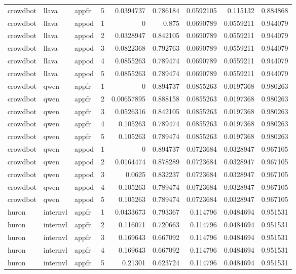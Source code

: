 \begin{longtable}{lllrrrrrr}
crowdbot & llava & appfr & 5 & 0.0394737 & 0.786184 & 0.0592105 & 0.115132 & 0.884868 \\
crowdbot & llava & appod & 1 & 0 & 0.875 & 0.0690789 & 0.0559211 & 0.944079 \\
crowdbot & llava & appod & 2 & 0.0328947 & 0.842105 & 0.0690789 & 0.0559211 & 0.944079 \\
crowdbot & llava & appod & 3 & 0.0822368 & 0.792763 & 0.0690789 & 0.0559211 & 0.944079 \\
crowdbot & llava & appod & 4 & 0.0855263 & 0.789474 & 0.0690789 & 0.0559211 & 0.944079 \\
crowdbot & llava & appod & 5 & 0.0855263 & 0.789474 & 0.0690789 & 0.0559211 & 0.944079 \\
crowdbot & qwen & appfr & 1 & 0 & 0.894737 & 0.0855263 & 0.0197368 & 0.980263 \\
crowdbot & qwen & appfr & 2 & 0.00657895 & 0.888158 & 0.0855263 & 0.0197368 & 0.980263 \\
crowdbot & qwen & appfr & 3 & 0.0526316 & 0.842105 & 0.0855263 & 0.0197368 & 0.980263 \\
crowdbot & qwen & appfr & 4 & 0.105263 & 0.789474 & 0.0855263 & 0.0197368 & 0.980263 \\
crowdbot & qwen & appfr & 5 & 0.105263 & 0.789474 & 0.0855263 & 0.0197368 & 0.980263 \\
crowdbot & qwen & appod & 1 & 0 & 0.894737 & 0.0723684 & 0.0328947 & 0.967105 \\
crowdbot & qwen & appod & 2 & 0.0164474 & 0.878289 & 0.0723684 & 0.0328947 & 0.967105 \\
crowdbot & qwen & appod & 3 & 0.0625 & 0.832237 & 0.0723684 & 0.0328947 & 0.967105 \\
crowdbot & qwen & appod & 4 & 0.105263 & 0.789474 & 0.0723684 & 0.0328947 & 0.967105 \\
crowdbot & qwen & appod & 5 & 0.105263 & 0.789474 & 0.0723684 & 0.0328947 & 0.967105 \\
huron & internvl & appfr & 1 & 0.0433673 & 0.793367 & 0.114796 & 0.0484694 & 0.951531 \\
huron & internvl & appfr & 2 & 0.116071 & 0.720663 & 0.114796 & 0.0484694 & 0.951531 \\
huron & internvl & appfr & 3 & 0.169643 & 0.667092 & 0.114796 & 0.0484694 & 0.951531 \\
huron & internvl & appfr & 4 & 0.169643 & 0.667092 & 0.114796 & 0.0484694 & 0.951531 \\
huron & internvl & appfr & 5 & 0.21301 & 0.623724 & 0.114796 & 0.0484694 & 0.951531 \\

\end{longtable}
